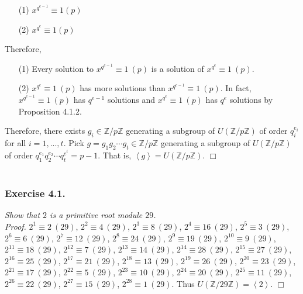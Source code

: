 \documentclass{article}
\begin{document}
\begin{enumerate}
\item[(1)]
$x^{q^{e-1}} \equiv 1 (p)$
\item[(2)]
$x^{q^{e}} \equiv 1 (p)$
\end{enumerate}

Therefore,

\begin{enumerate}
\item[(1)]
Every solution to $x^{q^{e-1}} \equiv 1 \: (p)$ is a solution of $x^{q^{e}} \equiv 1 \: (p)$.
\item[(2)]
$x^{q^{e}} \equiv 1 \: (p)$ has more solutions than $x^{q^{e-1}} \equiv 1 \: (p)$.
In fact, $x^{q^{e-1}} \equiv 1 \: (p)$ has $q^{e-1}$ solutions and $x^{q^{e}} \equiv 1 \: (p)$
has $q^{e}$ solutions by Proposition 4.1.2.
\end{enumerate}

Therefore, there exists $g_i \in \mathbb{Z}/p\mathbb{Z}$ generating a subgroup of
$U(\mathbb{Z}/p\mathbb{Z})$ of order $q_i^{e_i}$ for all $i = 1, ..., t$.
Pick $g = g_1 g_2 \cdots g_t \in \mathbb{Z}/p\mathbb{Z}$ generating a subgroup of
$U(\mathbb{Z}/p\mathbb{Z})$ of order $q_1^{e_1} q_2^{e_2} \cdots q_t^{e^t} = p - 1$.
That is, $\left \langle g \right \rangle = U(\mathbb{Z}/p\mathbb{Z})$.
$\Box$ \\\\






\subsubsection*{Exercise 4.1.}
\emph{Show that $2$ is a primitive root module $29$.}\\

\emph{Proof.}
$2^1 \equiv 2 \: (29)$,
$2^2 \equiv 4 \: (29)$,
$2^3 \equiv 8 \: (29)$,
$2^4 \equiv 16 \: (29)$,
$2^5 \equiv 3 \: (29)$,
$2^6 \equiv 6 \: (29)$,
$2^7 \equiv 12 \: (29)$,
$2^8 \equiv 24 \: (29)$,
$2^9 \equiv 19 \: (29)$,
$2^{10} \equiv 9 \: (29)$,
$2^{11} \equiv 18 \: (29)$,
$2^{12} \equiv 7 \: (29)$,
$2^{13} \equiv 14 \: (29)$,
$2^{14} \equiv 28 \: (29)$,
$2^{15} \equiv 27 \: (29)$,
$2^{16} \equiv 25 \: (29)$,
$2^{17} \equiv 21 \: (29)$,
$2^{18} \equiv 13 \: (29)$,
$2^{19} \equiv 26 \: (29)$,
$2^{20} \equiv 23 \: (29)$,
$2^{21} \equiv 17 \: (29)$,
$2^{22} \equiv 5 \: (29)$,
$2^{23} \equiv 10 \: (29)$,
$2^{24} \equiv 20 \: (29)$,
$2^{25} \equiv 11 \: (29)$,
$2^{26} \equiv 22 \: (29)$,
$2^{27} \equiv 15 \: (29)$,
$2^{28} \equiv 1 \: (29)$. Thus
$U(\mathbb{Z}/29\mathbb{Z}) = \left \langle 2 \right \rangle$.
$\Box$ \\
\end{document}
